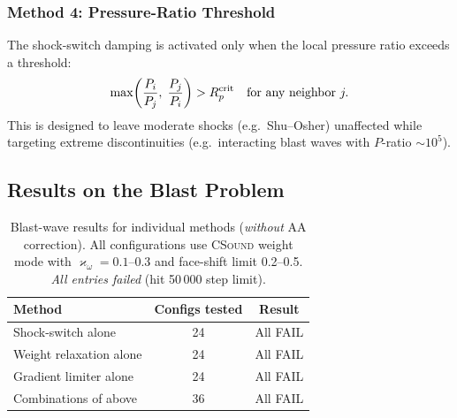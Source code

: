 \documentclass[twocolumn]{aastex63}
\begin{document}
\subsubsection{Method 4: Pressure-Ratio Threshold}
The shock-switch damping is activated only when the local
pressure ratio exceeds a threshold:
\begin{equation}
  \max\!\left(\frac{P_i}{P_j},\;\frac{P_j}{P_i}\right) > R_p^{\rm crit}
  \quad\text{for any neighbor } j.
\end{equation}
This is designed to leave moderate shocks (e.g.\ Shu--Osher)
unaffected while targeting extreme discontinuities
(e.g.\ interacting blast waves with $P$-ratio $\sim10^5$).

\subsection{Results on the Blast Problem}

\begin{table}[h!]
\caption{Blast-wave results for individual methods (\textit{without}
  AA correction).  All configurations use \textsc{CSound} weight mode
  with $\varkappa_\omega=0.1$--0.3 and face-shift limit 0.2--0.5.
  \textit{All entries failed} (hit 50\,000 step limit).}
\label{tab:blast_noaa}
\centering
\begin{tabular}{lcc}
\toprule
Method & Configs tested & Result \\
\midrule
Shock-switch alone    & 24 & All FAIL \\
Weight relaxation alone & 24 & All FAIL \\
Gradient limiter alone  & 24 & All FAIL \\
Combinations of above   & 36 & All FAIL \\
\bottomrule
\end{tabular}
\end{table}
\end{document}
